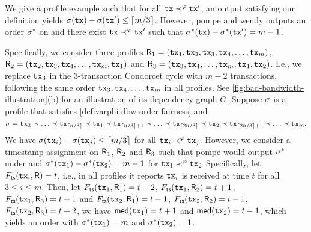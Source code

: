 \begin{example}
    We give a profile example \profileSet such that for all $\mathtt{tx} \prec^\varphi \mathtt{tx}'$, an output \orderOutput satisfying our definition yields $\sigma(\mathtt{tx}) - \sigma(\mathtt{tx}') \le \lceil m / 3 \rceil$.
    However, \textsf{pompe} and \textsf{wendy} outputs an order $\sigma^\ast$ on \profileSet and there exist $\mathtt{tx} \prec^\varphi \mathtt{tx}'$ such that $\sigma^\ast(\mathtt{tx}) - \sigma^\ast(\mathtt{tx}') = m - 1$.

    Specifically, we consider three profiles $\mathsf{R}_1 =( \mathtt{tx}_1, \mathtt{tx}_2, \mathtt{tx}_3, \mathtt{tx}_4, \ldots,\allowbreak \mathtt{tx}_m)$, $\mathsf{R}_2 = (\mathtt{tx}_2, \mathtt{tx}_3, \mathtt{tx}_4,\allowbreak \ldots, \mathtt{tx}_m, \mathtt{tx}_1)$ and $\mathsf{R}_3 =( \mathtt{tx}_3, \mathtt{tx}_4, \ldots, \mathtt{tx}_m, \mathtt{tx}_1, \mathtt{tx}_2)$.
    I.e., we replace $\mathtt{tx}_3$ in the 3-transaction Condorcet cycle with $m - 2$ transactions, following the same order $\mathtt{tx}_3, \mathtt{tx}_4, \ldots, \mathtt{tx}_m$ in all profiles.
    See \cref{fig:bad-bandwidth-illustration}(b) for an illustration of its dependency graph $G$.
    Suppose $\sigma$ is a profile that satisfies \cref{def:varphi-dbw-order-fairness} and
    \[
        \sigma = \mathtt{tx}_3 \prec \ldots \prec \mathtt{tx}_{\lceil n / 3 \rceil} \prec \mathtt{tx}_1 \prec \mathtt{tx}_{\lceil n / 3 \rceil + 1} \prec \ldots \prec \mathtt{tx}_{\lceil 2n / 3 \rceil} \prec \mathtt{tx}_2 \prec \mathtt{tx}_{\lceil 2n / 3 \rceil + 1} \prec \ldots \prec  \mathtt{tx}_{m}.
    \]
    We have $\sigma(\mathtt{tx}_i) - \sigma(\mathtt{tx}_j) \le \lceil m / 3 \rceil$ for all  $\mathtt{tx}_i \prec^\varphi \mathtt{tx}_j$.
    However, we consider a timestamp assignment \mapTimestamp on $\mathsf{R}_1$, $\mathsf{R}_2$ and $\mathsf{R}_3$ such that \textsf{pompe} would output $\sigma^\ast$ under \mapTimestamp and $\sigma^\ast(\mathtt{tx}_1) - \sigma^\ast(\mathtt{tx}_2) = m - 1$ for $\mathtt{tx}_1 \prec^\varphi \mathtt{tx}_2$
    Specifically, let $F_{\mathsf{ts}}(\mathtt{tx}_i, \mathsf{R}) = t$, i.e., in all profiles it reports $\mathtt{tx}_i$ is received at time $t$ for all $3 \le i \le m$.
    Then, let $F_{\mathsf{ts}}(\mathtt{tx}_1, \mathsf{R}_1) = t - 2$, $F_{\mathsf{ts}}(\mathtt{tx}_1, \mathsf{R}_2) = t + 1$, $F_{\mathsf{ts}}(\mathtt{tx}_1, \mathsf{R}_3) = t + 1$ and $F_{\mathsf{ts}}(\mathtt{tx}_2, \mathsf{R}_1) = t - 1$, $F_{\mathsf{ts}}(\mathtt{tx}_2, \mathsf{R}_2) = t - 1$, $F_{\mathsf{ts}}(\mathtt{tx}_2, \mathsf{R}_3) = t + 2$, we have $\mathsf{med}(\mathtt{tx}_1) = t + 1$ and $\mathsf{med}(\mathtt{tx}_2) = t - 1$, which yields an order with $\sigma^\ast(\mathtt{tx}_1) = m$ and $\sigma^\ast(\mathtt{tx}_2) = 1$.
\end{example}


